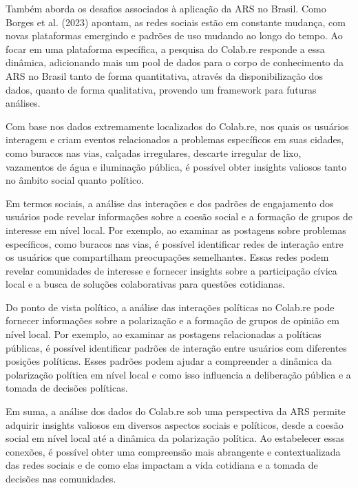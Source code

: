 Também aborda os desafios associados à aplicação da ARS no Brasil. Como Borges et al. (2023) apontam, as redes sociais estão em constante mudança, com novas plataformas emergindo e padrões de uso mudando ao longo do tempo. Ao focar em uma plataforma específica, a pesquisa do Colab.re responde a essa dinâmica, adicionando mais um pool de dados para o corpo de conhecimento da ARS no Brasil tanto de forma quantitativa, através da disponibilização dos dados, quanto de forma qualitativa, provendo um framework para futuras análises.

Com base nos dados extremamente localizados do Colab.re, nos quais os usuários interagem e criam eventos relacionados a problemas específicos em suas cidades, como buracos nas vias, calçadas irregulares, descarte irregular de lixo, vazamentos de água e iluminação pública, é possível obter insights valiosos tanto no âmbito social quanto político.

Em termos sociais, a análise das interações e dos padrões de engajamento dos usuários pode revelar informações sobre a coesão social e a formação de grupos de interesse em nível local. Por exemplo, ao examinar as postagens sobre problemas específicos, como buracos nas vias, é possível identificar redes de interação entre os usuários que compartilham preocupações semelhantes. Essas redes podem revelar comunidades de interesse e fornecer insights sobre a participação cívica local e a busca de soluções colaborativas para questões cotidianas.

Do ponto de vista político, a análise das interações políticas no Colab.re pode fornecer informações sobre a polarização e a formação de grupos de opinião em nível local. Por exemplo, ao examinar as postagens relacionadas a políticas públicas, é possível identificar padrões de interação entre usuários com diferentes posições políticas. Esses padrões podem ajudar a compreender a dinâmica da polarização política em nível local e como isso influencia a deliberação pública e a tomada de decisões políticas.

Em suma, a análise dos dados do Colab.re sob uma perspectiva da ARS permite adquirir insights valiosos em diversos aspectos sociais e políticos, desde a coesão social em nível local até a dinâmica da polarização política. Ao estabelecer essas conexões, é possível obter uma compreensão mais abrangente e contextualizada das redes sociais e de como elas impactam a vida cotidiana e a tomada de decisões nas comunidades.